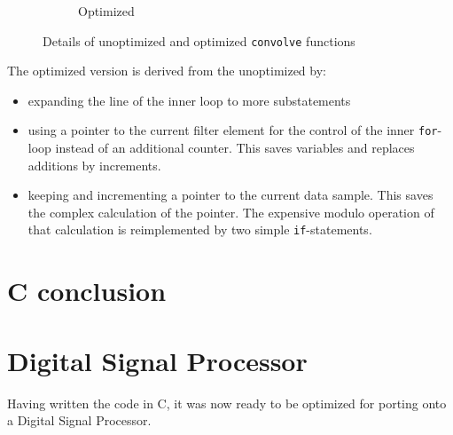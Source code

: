 \documentclass[a4paper]{article}
\begin{document}
\begin{figure}[htpb]
{\begin{subfigure}[c]{.7\textwidth}
\caption{Optimized}
\end{subfigure}
}
\caption{Details of unoptimized and optimized \texttt{convolve} functions}
\label{fig:convolvefunctions}
\end{figure}
\begin{minipage}{\textwidth}
The optimized version is derived from the unoptimized by:
\begin{itemize}
\item expanding the line of the inner loop to more substatements
\item using a pointer to the current filter element for the control of the inner \texttt{for}-loop instead of an additional counter. This saves variables and replaces additions by increments.
\item keeping and incrementing a pointer to the current data sample. This saves the complex calculation of the pointer. The expensive modulo operation of that calculation is reimplemented by two simple \texttt{if}-statements.
\end{itemize}
\end{minipage}

\section{C conclusion}

\section{Digital Signal Processor}
Having written the code in C, it was now ready to be optimized for porting onto a Digital Signal Processor.
\end{document}
